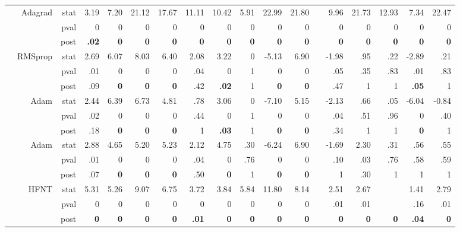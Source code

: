 \documentclass[11pt,a4paper]{article}
\begin{document}
\begin{table}
\begin{tabular}[t]{lrrrrrrrrrrrrrrrrr}
& Adagrad & stat & 3.19 & 7.20 & 21.12 & 17.67 & 11.11 & 10.42 & 5.91 & 22.99 & 21.80 &  & 9.96 & 21.73 & 12.93 & 7.34 & 22.47 \\
            &  & pval & 0 & 0 & 0 & 0 & 0 & 0 & 0 & 0 & 0 &  & 0 & 0 & 0 & 0 & 0 \\
            &  & post & \textbf{.02} & \textbf{0} & \textbf{0} & \textbf{0} & \textbf{0} & \textbf{0} & \textbf{0} & \textbf{0} & \textbf{0} &  & \textbf{0} & \textbf{0} & \textbf{0} & \textbf{0} & \textbf{0} \\
& RMSprop & stat & 2.69 & 6.07 & 8.03 & 6.40 & 2.08 & 3.22 & 0 & -5.13 & 6.90 &  & -1.98 & .95 & .22 & -2.89 & .21 \\
            &  & pval & .01 & 0 & 0 & 0 & .04 & 0 & 1 & 0 & 0 &  & .05 & .35 & .83 & .01 & .83 \\
            &  & post & .09 & \textbf{0} & \textbf{0} & \textbf{0} & .42 & \textbf{.02} & 1 & \textbf{0} & \textbf{0} &  & .47 & 1 & 1 & \textbf{.05} & 1 \\
& Adam & stat & 2.44 & 6.39 & 6.73 & 4.81 & .78 & 3.06 & 0 & -7.10 & 5.15 &  & -2.13 & .66 & .05 & -6.04 & -0.84 \\
            &  & pval & .02 & 0 & 0 & 0 & .44 & 0 & 1 & 0 & 0 &  & .04 & .51 & .96 & 0 & .40 \\
            &  & post & .18 & \textbf{0} & \textbf{0} & \textbf{0} & 1 & \textbf{.03} & 1 & \textbf{0} & \textbf{0} &  & .34 & 1 & 1 & \textbf{0} & 1 \\
&Adam & stat & 2.88 & 4.65 & 5.20 & 5.23 & 2.12 & 4.75 & .30 & -6.24 & 6.90 &  & -1.69 & 2.30 & .31 & .56 & .55  \\ 
            & & pval & .01 & 0 & 0 & 0 & .04 & 0 & .76 & 0 & 0 &  & .10 & .03 & .76 & .58 & .59  \\ 
            & & post & .07 & \textbf{0} & \textbf{0} & \textbf{0} & .50 & \textbf{0} & 1 & \textbf{0} & \textbf{0} &  & 1 & .30 & 1 & 1 & 1  \\ 
            \cmidrule{1-2}
            \parbox[t]{3mm}{}
            &HFNT & stat & 5.31 & 5.26 & 9.07 & 6.75 & 3.72 & 3.84 & 5.84 & 11.80 & 8.14 &  & 2.51 & 2.67 &  & 1.41 & 2.79 \\
            & & pval & 0 & 0 & 0 & 0 & 0 & 0 & 0 & 0 & 0 &  & .01 & .01 &  & .16 & .01 \\
            & & post & \textbf{0} & \textbf{0} & \textbf{0} & \textbf{0} & \textbf{.01} & \textbf{0} & \textbf{0} & \textbf{0} & \textbf{0} &  & \textbf{0} & \textbf{0} & \textbf{0} & \textbf{.04} & \textbf{0} \\            

\end{tabular}
\end{table}
\end{document}
